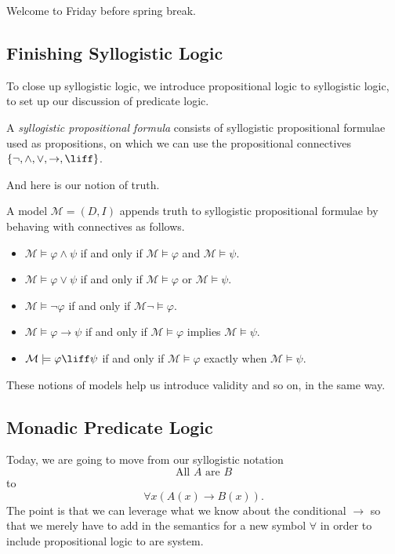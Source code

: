 
Welcome to Friday before spring break.

\subsection{Finishing Syllogistic Logic}
To close up syllogistic logic, we introduce propositional logic to syllogistic logic, to set up our discussion of predicate logic.
\begin{definition}
	A \textit{syllogistic propositional formula} consists of syllogistic propositional formulae used as propositions, on which we can use the propositional connectives $\{\lnot,\land,\lor,\to,\liff\}$.
\end{definition}
And here is our notion of truth.
\begin{definition}[Model]
	A model $\mathcal M=(D,I)$ appends truth to syllogistic propositional formulae by behaving with connectives as follows.
	\begin{itemize}
		\item $\mathcal M\models\varphi\land\psi$ if and only if $\mathcal M\models\varphi$ and $\mathcal M\models\psi$.
		\item $\mathcal M\models\varphi\lor\psi$ if and only if $\mathcal M\models\varphi$ or $\mathcal M\models\psi$.
		\item $\mathcal M\models\lnot\varphi$ if and only if $\mathcal M\lnot\models\varphi$.
		\item $\mathcal M\models\varphi\to\psi$ if and only if $\mathcal M\models\varphi$ implies $\mathcal M\models\psi$.
		\item $\mathcal M\models\varphi\liff\psi$ if and only if $\mathcal M\models\varphi$ exactly when $\mathcal M\models\psi$.
	\end{itemize}
\end{definition}
These notions of models help us introduce validity and so on, in the same way.

\subsection{Monadic Predicate Logic}
Today, we are going to move from our syllogistic notation
\[\textrm{All $A$ are $B$}\]
to
\[\forall x(A(x)\to B(x)).\]
The point is that we can leverage what we know about the conditional $\to$ so that we merely have to add in the semantics for a new symbol $\forall$ in order to include propositional logic to are system.


